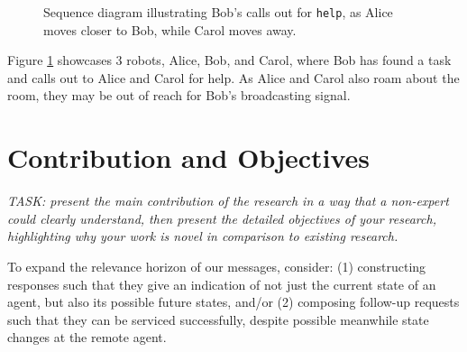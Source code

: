 \documentclass[conference]{IEEEtran}
\begin{document}
\begin{figure}
\centering
{}
\caption{Sequence diagram illustrating Bob's calls out for
\texttt{help}, as Alice moves closer to Bob, while Carol moves away.}
\label{fig1}
\end{figure}

Figure \ref{fig1} showcases 3 robots, Alice, Bob, and Carol, where Bob
has found a task and calls out to Alice and Carol for help. As Alice
and Carol also roam about the room, they may be out of reach for Bob's
broadcasting signal.

\section{Contribution and Objectives}

\emph{TASK: present the main contribution of the research in a way
that a non-expert could clearly understand, then present the detailed
objectives of your research, highlighting why your work is novel in
comparison to existing research.}

To expand the relevance horizon of our messages, consider: (1)
constructing responses such that they give an indication of not just
the current state of an agent, but also its possible future states,
and/or (2) composing follow-up requests such that they can be serviced
successfully, despite possible meanwhile state changes at the remote
agent.
\end{document}
